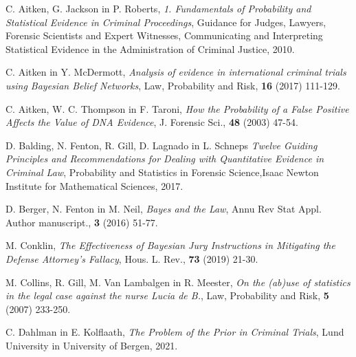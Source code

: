 \documentclass[fin1, tisk]{fmfdelo}
\theoremstyle{definition} %
\theoremstyle{trditev} %
\theoremstyle{izrek}
\begin{document}
\pagebreak
\begin{thebibliography}{99}
        C. Aitken, G. Jackson in P. Roberts, \emph{1. Fundamentals of Probability and Statistical Evidence in Criminal Proceedings}, Guidance for Judges, Lawyers, Forensic Scientists and Expert Witnesses, Communicating and Interpreting Statistical Evidence in the Administration of Criminal Justice, 2010.

        C. Aitken in Y. McDermott, \emph{Analysis of evidence in international criminal trials using Bayesian Belief Networks}, Law, Probability and Risk, \textbf{16} (2017) 111-129.

        C. Aitken, W. C. Thompson in F. Taroni, \emph{How the Probability of a False Positive Affects the Value of DNA Evidence}, J. Forensic Sci., \textbf{48} (2003) 47-54.

        D. Balding, N. Fenton, R. Gill, D. Lagnado in L. Schneps \emph{Twelve Guiding Principles and Recommendations for Dealing with Quantitative Evidence in Criminal Law}, Probability and Statistics in Forensic Science,Isaac Newton Institute for Mathematical Sciences, 2017.

        D. Berger, N. Fenton in M. Neil, \emph{Bayes and the Law}, Annu Rev Stat Appl. Author manuscript., \textbf{3} (2016) 51-77.

        M. Conklin, \emph{The Effectiveness of Bayesian Jury Instructions in Mitigating the Defense Attorney's Fallacy}, Hous. L. Rev., \textbf{73} (2019) 21-30.

        M. Collins, R. Gill, M. Van Lambalgen in R. Meester, \emph{On the (ab)use of statistics in the legal case against the nurse Lucia de B.}, Law, Probability and Risk, \textbf{5} (2007) 233-250.

        C. Dahlman in E. Kolflaath, \emph{The Problem of the Prior in Criminal Trials}, Lund University in University of Bergen, 2021.


\end{thebibliography}
\end{document}
